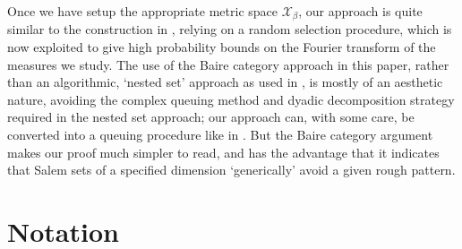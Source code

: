 \documentclass[12pt,reqno]{article}
\numberwithin{equation}{section}
\begin{document}
Once we have setup the appropriate metric space $\mathcal{X}_\beta$, our approach is quite similar to the construction in \cite{OurPaper}, relying on a random selection procedure, which is now exploited to give high probability bounds on the Fourier transform of the measures we study. The use of the Baire category approach in this paper, rather than an algorithmic, `nested set' approach as used in \cite{OurPaper}, is mostly of an aesthetic nature, avoiding the complex queuing method and dyadic decomposition strategy required in the nested set approach; our approach can, with some care, be converted into a queuing procedure like in \cite{OurPaper}. But the Baire category argument makes our proof much simpler to read, and has the advantage that it indicates that Salem sets of a specified dimension `generically' avoid a given rough pattern.%

\section{Notation} \label{notationSection}
\end{document}
